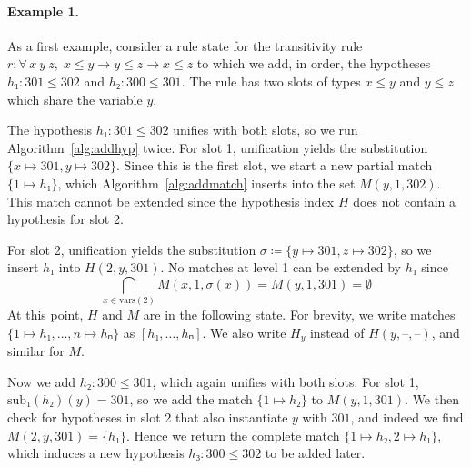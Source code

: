 \documentclass[runningheads]{llncs}
\newcommand{\All}[2]{\ensuremath{\forall\, #1,\; #2}}
\newcommand{\vars}{\ensuremath{\mathrm{vars}}}
\newcommand{\sub}{\ensuremath{\mathrm{sub}}}
\begin{document}
\paragraph{Example 1.}
As a first example, consider a rule state for the transitivity rule $r : \All{x~y~z}{x ≤ y → y ≤ z → x ≤ z}$ to which we add, in order, the hypotheses
$h₁ : 301 ≤ 302$ and $h₂ : 300 ≤ 301$.
The rule has two slots of types $x ≤ y$ and $y ≤ z$ which share the variable $y$.

The hypothesis $h₁ : 301 ≤ 302$ unifies with both slots, so we run Algorithm~\ref{alg:addhyp} twice.
For slot 1, unification yields the substitution $\{x ↦ 301, y ↦ 302\}$.
Since this is the first slot, we start a new partial match $\{1 ↦ h₁\}$, which Algorithm~\ref{alg:addmatch} inserts into the set $M(y, 1, 302)$.
This match cannot be extended since the hypothesis index $H$ does not contain a hypothesis for slot 2.

For slot 2, unification yields the substitution $σ ≔ \{y ↦ 301, z ↦ 302\}$, so we insert $h₁$ into $H(2, y, 301)$.
No matches at level 1 can be extended by $h₁$ since
\[
  \bigcap_{x \in \vars(2)} M(x, 1, σ(x)) = M(y, 1, 301) = \emptyset
\]
At this point, $H$ and $M$ are in the following state.
For brevity, we write matches $\{1 ↦ h₁, \dots, n ↦ hₙ\}$ as $[h₁, \dots, hₙ]$.
We also write $H_{y}$ instead of $H(y, \text{--}, \text{--})$, and similar for $M$.
\begin{center}
\end{center}

Now we add $h₂ : 300 ≤ 301$, which again unifies with both slots.
For slot 1, $\sub₁(h₂)(y) = 301$, so we add the match $\{1 ↦ h₂\}$ to $M(y, 1, 301)$.
We then check for hypotheses in slot 2 that also instantiate $y$ with $301$, and indeed we find $M(2, y, 301) = \{h₁\}$.
Hence we return the complete match $\{1 ↦ h₂, 2 ↦ h₁\}$, which induces a new hypothesis $h₃ : 300 ≤ 302$ to be added later.
\end{document}
